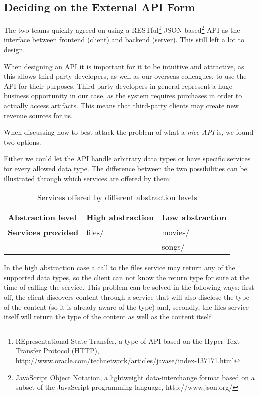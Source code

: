 \subsection{Deciding on the External API Form}
The two teams quickly agreed on using a RESTful\footnote{REpresentational State
Transfer, a type of API based on the Hyper-Text Transfer Protocol (HTTP),
http://www.oracle.com/technetwork/articles/javase/index-137171.html}
JSON-based\footnote{ JavaScript Object Notation, a lightweight data-interchange
format based on a subset of the JavaScript programming language,
http://www.json.org/} API as the interface between frontend (client) and
backend (server). This still left a lot to design.

When designing an API it is important for it to be intuitive and attractive, as this
allows third-party developers, as well as our overseas colleagues, to use the API for
their purposes. Third-party developers in general represent a huge business opportunity
in our case, as the system requires purchases in order to actually access artifacts. This
means that third-party clients may create new revenue sources for us.

When discussing how to best attack the problem of what a \emph{nice API} is, we found two
options.

Either we could let the API handle arbitrary data types or have specific services for
every allowed data type. The difference between the two possibilities can be illustrated
through which services are offered by them:

\begin{table}[hbt]
    \centering
    \begin{tabular}{ | l | l | l | }
        \hline
        \textbf{Abstraction level} & High abstraction & Low abstraction \\
        \hline
        \textbf{Services provided} & files/ & movies/ \\
        &  & songs/ \\
        \hline
    \end{tabular}
    \caption{Services offered by different abstraction levels}
\end{table}

In the high abstraction case a call to the files service may return any of the
supported data types, so the client can not know the return type for sure at
the time of calling the service. This problem can be solved in the following
ways: first off, the client discovers content through a service that will also
disclose the type of the content (so it is already aware of the type) and,
secondly, the files-service itself will return the type of the content as well
as the content itself.

